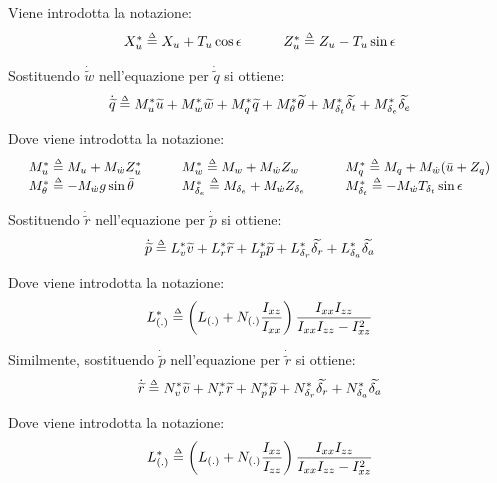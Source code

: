 \begin{sitemize}
    \item Viene introdotta la notazione:
    \begin{equation*}
        \setlength{\arraycolsep}{1.5em}
        \begin{array}{lll}
            X_u^* \defequal X_u + T_u\cos\epsilon & Z_u^* \defequal Z_u - T_u\sin\epsilon
        \end{array}
    \end{equation*}

    \item Sostituendo $\dot{\widetilde{w}}$ nell'equazione per $\dot{\widetilde{q}}$ si ottiene:
    \begin{equation*}
        \dot{\widetilde{q}} \overset{\scriptscriptstyle\Delta}{=} M_u^*\widetilde{u} + M_w^*\widetilde{w} + M_q^*\widetilde{q} + M_{\theta}^*\widetilde{\theta} + M_{\delta_t}^*\widetilde{\delta_t} + M_{\delta_e}^*\widetilde{\delta_e}
    \end{equation*}

    Dove viene introdotta la notazione:
    \begin{equation}
        \label{eq:mStar}
        \setlength{\arraycolsep}{1.5em}
        \begin{array}{lll}
            M_u^* \defequal M_u + M_{\dot{w}}Z_u^*                & M_w^* \defequal M_w + M_{\dot{w}}Z_w                            & M_q^* \defequal M_q + M_{\dot{w}}(\bar{u} + Z_q)               \\
            M_{\theta}^* \defequal - M_{\dot{w}}g\sin\bar{\theta} & M_{\delta_e}^* \defequal M_{\delta_e} + M_{\dot{w}}Z_{\delta_e} & M_{\delta_t}^* \defequal - M_{\dot{w}}T_{\delta_t}\sin\epsilon
        \end{array}
    \end{equation}

    \item Sostituendo $\dot{\widetilde{r}}$ nell'equazione per $\dot{\widetilde{p}}$ si ottiene:
    \begin{equation*}
        \dot{\widetilde{p}} \overset{\scriptscriptstyle\Delta}{=} L_v^*\widetilde{v} + L_r^*\widetilde{r} + L_p^*\widetilde{p} + L_{\delta_r}^*\widetilde{\delta_r }+ L_{\delta_a}^*\widetilde{\delta_a}
    \end{equation*}

    Dove viene introdotta la notazione: $$L_{(.)}^* \overset{\scriptscriptstyle\Delta}{=} \left(L_{(.)} + N_{(.)}\displaystyle\frac{I_{xz}}{I_{xx}}\right)\displaystyle\frac{I_{xx}I_{zz}}{I_{xx}I_{zz} - I_{xz}^2}$$

    \item Similmente, sostituendo $\dot{\widetilde{p}}$ nell'equazione per $\dot{\widetilde{r}}$ si ottiene:
    \begin{equation*}
        \dot{\widetilde{r}} \overset{\scriptscriptstyle\Delta}{=} N_v^*\widetilde{v} + N_r^*\widetilde{r} + N_p^*\widetilde{p} + N_{\delta_r}^*\widetilde{\delta_r }+ N_{\delta_a}^*\widetilde{\delta_a}
    \end{equation*}

    Dove viene introdotta la notazione: $$L_{(.)}^* \overset{\scriptscriptstyle\Delta}{=} \left(L_{(.)} + N_{(.)}\displaystyle\frac{I_{xz}}{I_{zz}}\right)\displaystyle\frac{I_{xx}I_{zz}}{I_{xx}I_{zz} - I_{xz}^2}$$
\end{sitemize}

